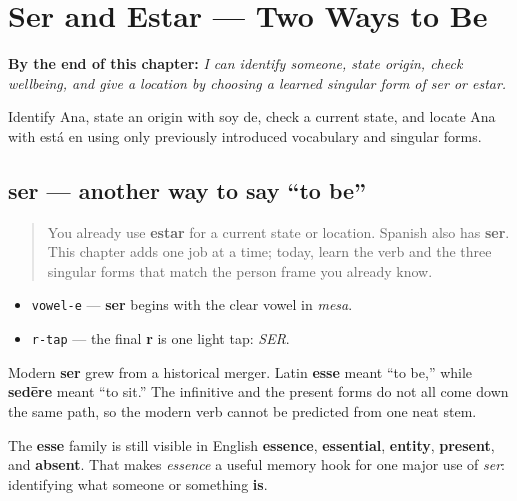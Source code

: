 
\chapter{Ser and Estar --- Two Ways to Be}
\label{ch:ser-y-estar}

\begin{chapteropening}
\textbf{By the end of this chapter:} \emph{I can identify someone, state origin, check wellbeing, and give a location by choosing a learned singular form of ser or estar.}

Identify Ana, state an origin with soy de, check a current state, and locate Ana with está en using only previously introduced vocabulary and singular forms.
\end{chapteropening}

\section[ser]{ser — another way to say “to be”}

\label{lesson:ES-C09-ser}



\begin{quote}
You already use \textbf{estar} for a current state or location. Spanish also has \textbf{ser}. This chapter adds one job at a time; today, learn the verb and the three singular forms that match the person frame you already know.
\end{quote}

\begin{sounds}
\begin{itemize}
\raggedright
  \item \texttt{vowel-e} — \textbf{ser} begins with the clear vowel in \emph{mesa}.
  \item \texttt{r-tap} — the final \textbf{r} is one light tap: \emph{SER}.
\end{itemize}
\end{sounds}

\begin{cousinweb}
Modern \textbf{ser} grew from a historical merger. Latin \textbf{esse} meant “to be,” while \textbf{sedēre} meant “to sit.” The infinitive and the present forms do not all come down the same path, so the modern verb cannot be predicted from one neat stem.

The \textbf{esse} family is still visible in English \textbf{essence}, \textbf{essential}, \textbf{entity}, \textbf{present}, and \textbf{absent}. That makes \emph{essence} a useful memory hook for one major use of \emph{ser}: identifying what someone or something \textbf{is}.
\end{cousinweb}

